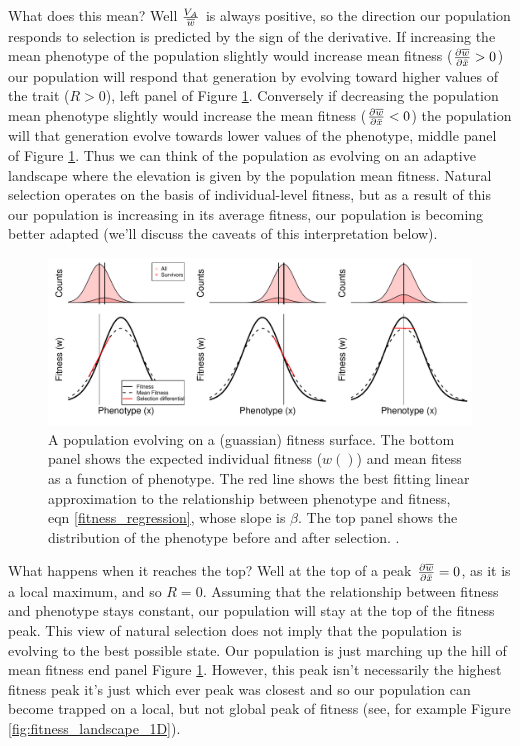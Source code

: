 What does this mean? Well $\frac{V_A}{\overline{w}}$ is always positive,
so the direction our population responds to selection is
predicted by the sign of the derivative. If increasing the mean
phenotype of the population slightly would 
increase mean fitness ($ \frac{\partial \overline{w}}{\partial \bar{x}}
>0$) our population will respond that generation by evolving toward
higher values of the trait ($R>0$), left panel of Figure \ref{fig:fitness_landscape_1D_w_wbar}. Conversely if decreasing the
population mean phenotype slightly would increase the mean fitness ($ \frac{\partial \overline{w}}{\partial \bar{x}}
<0$) the population will that generation evolve towards lower values
of the phenotype, middle panel of Figure \ref{fig:fitness_landscape_1D_w_wbar}. Thus we can think of the population as evolving on
an adaptive landscape where the elevation is given by the population mean
fitness. Natural selection operates on the basis of individual-level
fitness, but as a result of this our population is increasing in its
average fitness, our population is becoming better adapted (we'll
discuss the caveats of this interpretation below).

 \begin{figure}
 \begin{center}
 \includegraphics[width= 0.8 \textwidth]{figures/Response_to_sel/fitness_landscape_1D_w_wbar.pdf}
 \end{center}
 \caption{A population evolving on a (guassian) fitness surface. The
   bottom panel shows the expected individual fitness ($w()$) and mean
   fitess as a function of phenotype. The red line shows the best
   fitting linear approximation to the relationship between phenotype
   and fitness, eqn \eqref{fitness_regression}, whose slope is
   $\beta$. The top panel shows the distribution of the phenotype
   before and after selection. .} \label{fig:fitness_landscape_1D_w_wbar}  
 \end{figure}
 

What happens when it
reaches the top? Well at the top of a peak $ \frac{\partial
  \overline{w}}{\partial \bar{x}}=0$, as it is a local maximum, and so
$R=0$. Assuming that the relationship between fitness and phenotype
stays constant, our population will stay at the top of the fitness
peak. This view of natural selection does not imply that the population
is evolving to the best possible state. Our population is just
marching up the hill of mean fitness end panel Figure
\ref{fig:fitness_landscape_1D_w_wbar}. However, this peak isn't necessarily the highest fitness peak it's just
which ever peak was closest and so our population can become trapped
on a local, but not global peak of fitness (see, for example Figure \ref{fig:fitness_landscape_1D}).

